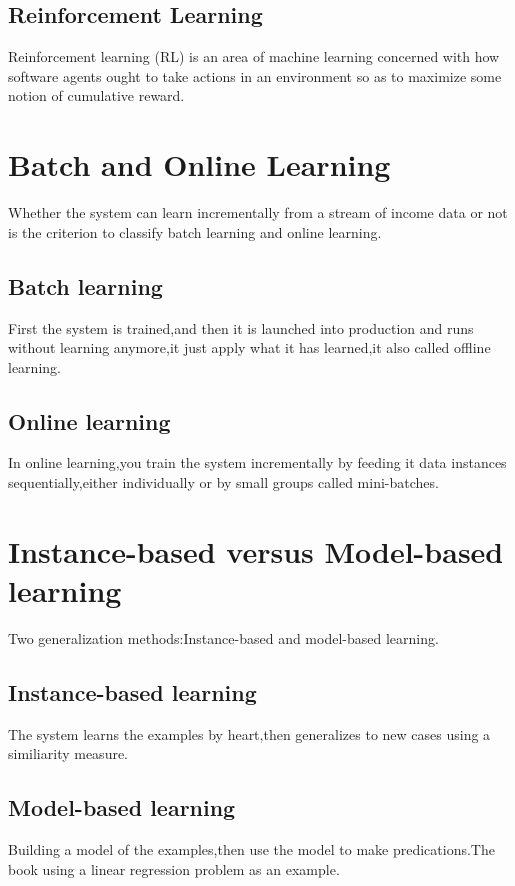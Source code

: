 \documentclass[UTF8]{ctexart}
\begin{document}
\subsection{Reinforcement Learning}
Reinforcement learning (RL) is an area of machine learning concerned with how software agents ought to take actions in an environment so as to maximize some notion of cumulative reward. 

\section{Batch and Online Learning}
Whether the system can learn incrementally from a stream of income data or not is the criterion to classify batch learning and online learning.

\subsection{Batch learning}
First the system is trained,and then it is launched into production and runs without learning anymore,it just apply what it has learned,it also called offline learning.

\subsection{Online learning}
In online learning,you train the system incrementally by feeding it data instances sequentially,either individually or by small groups called mini-batches.

\section{Instance-based versus Model-based learning}
Two generalization methods:Instance-based and model-based learning.

\subsection{Instance-based learning}
The system learns the examples by heart,then generalizes to new cases using a similiarity measure.

\subsection{Model-based learning}
Building a model of the examples,then use the model to make predications.The book using a linear regression problem as an example.
\end{document}
